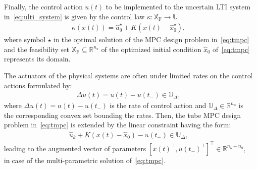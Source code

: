 \documentclass[letterpaper, 10 pt, conference]{ieeeconf}
\begin{document}
	Finally, the control action $u(t)$ to be implemented to the uncertain LTI system in~\eqref{eq:ulti_system} is given by the control law $\kappa : \mathbb{X}_{\mathrm{F}} \rightarrow \mathbb{U}$
	\begin{eqnarray}
		\label{eq:tmpc_control_law}
		\kappa(x(t)) = \hat{u}_{0}^{\star} + K \left( x(t) - \hat{x}_{0}^{\star} \right),
	\end{eqnarray}
	where symbol $\star$ in the optimal solution of the MPC design problem in~\eqref{eq:tmpc} and the feasibility set $\mathbb{X}_{\mathrm{F}} \subseteq \mathbb{R}^{n_{\mathrm{x}}}$ of the optimized initial condition $\hat{x}_{0}$ of~\eqref{eq:tmpc} represents its domain. 
	
	
	The actuators of the physical systems are often under limited rates on the control actions formulated by:
	\begin{eqnarray}
		\label{eq:rate_constraints_x_u}
		\Delta u(t) = u(t) - u(t_{-}) \in \mathbb{U}_{\Delta} ,
	\end{eqnarray}
	where $\Delta u(t) = u(t) - u(t_{-})$ is the rate of control action and $\mathbb{U}_{\Delta} \in \mathbb{R}^{n_{\mathrm{u}}}$ is the corresponding convex set bounding the rates. Then, the tube MPC design problem in~\eqref{eq:tmpc} is extended by the linear constraint having the form: 
	\begin{eqnarray}
		\label{eq:tmpc_constraints_input_delta_0}
		\hat{u}_{k} + K ( x(t) - \hat{x}_{0} ) - u(t_{-}) \in \mathbb{U}_{\Delta} , 
	\end{eqnarray}
	leading to the augmented vector of parameters $[x(t)^{\top}, u(t_{-})^{\top}]^{\top} \in \mathbb{R}^{n_{\mathrm{x}} + n_{\mathrm{u}}}$, in case of the multi-parametric solution of~\eqref{eq:tmpc}.
	
\end{document}

